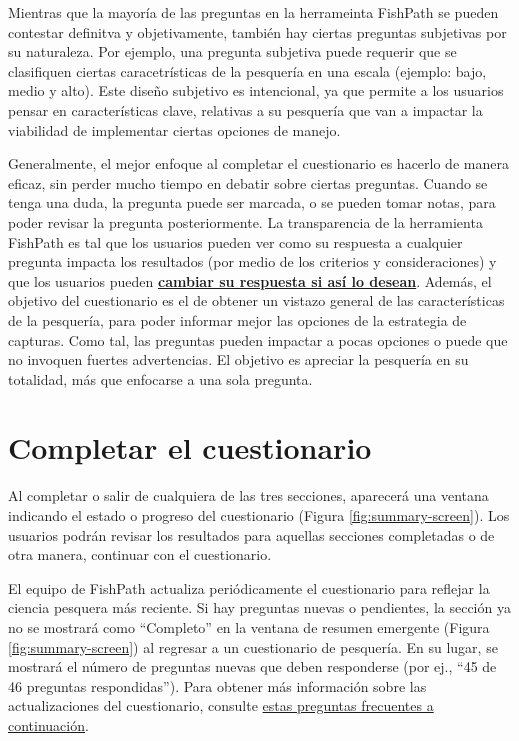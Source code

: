 \documentclass[
  11pt,
]{book}
\begin{document}
Mientras que la mayoría de las preguntas en la herrameinta FishPath se pueden contestar definitva y objetivamente, también hay ciertas preguntas subjetivas por su naturaleza. Por ejemplo, una pregunta subjetiva puede requerir que se clasifiquen ciertas caracetrísticas de la pesquería en una escala (ejemplo: bajo, medio y alto). Este diseño subjetivo es intencional, ya que permite a los usuarios pensar en características clave, relativas a su pesquería que van a impactar la viabilidad de implementar ciertas opciones de manejo.

Generalmente, el mejor enfoque al completar el cuestionario es hacerlo de manera eficaz, sin perder mucho tiempo en debatir sobre ciertas preguntas. Cuando se tenga una duda, la pregunta puede ser marcada, o se pueden tomar notas, para poder revisar la pregunta posteriormente. La transparencia de la herramienta FishPath es tal que los usuarios pueden ver como su respuesta a cualquier pregunta impacta los resultados (por medio de los criterios y consideraciones) y que los usuarios pueden \protect\hyperlink{Bookmark-Influential}{\textbf{cambiar su respuesta si así lo desean}}. Además, el objetivo del cuestionario es el de obtener un vistazo general de las características de la pesquería, para poder informar mejor las opciones de la estrategia de capturas. Como tal, las preguntas pueden impactar a pocas opciones o puede que no invoquen fuertes advertencias. El objetivo es apreciar la pesquería en su totalidad, más que enfocarse a una sola pregunta.

\hypertarget{completar-el-cuestionario}{%
\section{Completar el cuestionario}\label{completar-el-cuestionario}}

Al completar o salir de cualquiera de las tres secciones, aparecerá una ventana indicando el estado o progreso del cuestionario (Figura \ref{fig:summary-screen}). Los usuarios podrán revisar los resultados para aquellas secciones completadas o de otra manera, continuar con el cuestionario.

El equipo de FishPath actualiza periódicamente el cuestionario para reflejar la ciencia pesquera más reciente. Si hay preguntas nuevas o pendientes, la sección ya no se mostrará como ``Completo'' en la ventana de resumen emergente (Figura \ref{fig:summary-screen}) al regresar a un cuestionario de pesquería. En su lugar, se mostrará el número de preguntas nuevas que deben responderse (por ej., ``45 de 46 preguntas respondidas''). Para obtener más información sobre las actualizaciones del cuestionario, consulte \protect\hyperlink{faq-content-updates}{estas preguntas frecuentes a continuación}.
\end{document}
